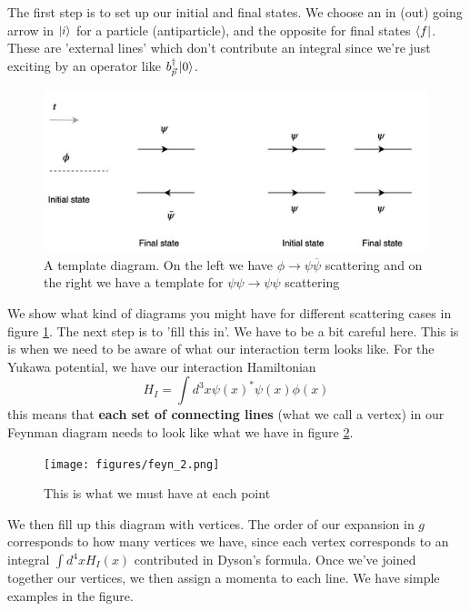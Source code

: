 \documentclass[11pt, oneside]{article}   	%
\theoremstyle{newline}
\theoremstyle{newline}
\theoremstyle{newline}
\theoremstyle{newline}
\theoremstyle{newline}
\begin{document}
The first step is to set up our 
initial and final states. 
We choose an in (out) going arrow in $ \ket{ i } $ for a 
particle (antiparticle), and the opposite for final states $ \bra { f} $. 
These are 'external lines' which don't contribute an integral 
since we're just exciting by an operator like $ b_{ \vec{p} } ^ \dagger \ket{ 0 } $. 

\begin{figure}[htpb]
\centering
\includegraphics[width=0.8\linewidth]{figures/feyn_1.jpg}
\caption{A template diagram. On the left we have $\phi \to \psi \overline{\psi}$ scattering 
and on the right we have a template for $ \psi \psi \to \psi \psi $ scattering}%
\label{fig:template Feyn}
\end{figure}

We show what kind of diagrams you might have 
for different scattering cases in figure \ref{fig:template Feyn}. 
The next step is to 'fill this in'. We have to be a bit 
careful here. This is is when we need to be aware of what our interaction term looks like. 
For the Yukawa potential, we have our interaction Hamiltonian 
\[
H_I  = \int d^ 3 x \psi ( x) ^ * \psi ( x) \phi ( x) 
\] this means that \textbf{each set of connecting lines} (what we 
call a vertex) in our Feynman diagram needs to look like what we have 
in figure \ref{fig:figures/feyn2}. 
\begin{figure}[htpb]
\centering
\hspace{3cm} \texttt{[image: figures/feyn\_2.png]}
\caption{This is what we must have at each point}%
\label{fig:figures/feyn2}
\end{figure}
We then fill up this diagram with vertices. 
The order of our expansion in $ g $ corresponds 
to how many vertices we have, since each vertex
corresponds to an integral $ \int d^ 4 x H_ I ( x ) $
contributed in Dyson's formula.
Once we've joined together our vertices, we then 
assign a momenta to each line. We have simple examples in the figure. 
\end{document}
